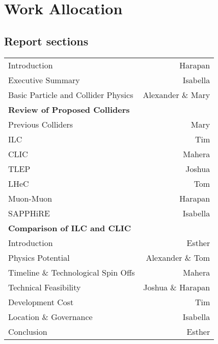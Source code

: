 \section*{Work Allocation}
\subsection*{Report sections}

\begin{tabularx}{\textwidth}{X r}

    Introduction & Harapan \\
    Executive Summary & Isabella \\
    Basic Particle and Collider Physics & Alexander \& Mary \\
    
    \textbf{Review of Proposed Colliders} & \\
        \hspace{1em} Previous Colliders & Mary \\
        \hspace{1em} ILC & Tim \\
        \hspace{1em} CLIC & Mahera \\
        \hspace{1em} TLEP & Joshua \\
        \hspace{1em} LHeC & Tom \\
        \hspace{1em} Muon-Muon & Harapan \\
        \hspace{1em} SAPPHiRE & Isabella \\        
        
    \textbf{Comparison of ILC and CLIC} & \\
        \hspace{1em} Introduction & Esther \\
        \hspace{1em} Physics Potential & Alexander \& Tom \\
        \hspace{1em} Timeline \& Technological Spin Offs & Mahera \\
        \hspace{1em} Technical Feasibility & Joshua \& Harapan \\
        \hspace{1em} Development Cost & Tim \\
        \hspace{1em} Location \& Governance & Isabella \\
        
    Conclusion & Esther \\    
        

\end{tabularx}

